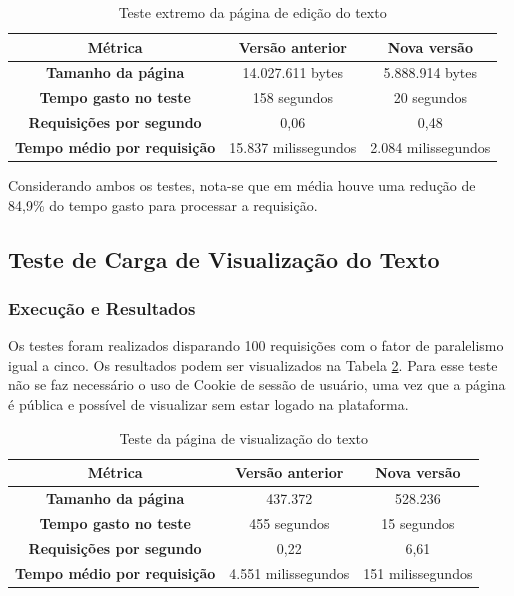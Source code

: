 \begin{table}[h]
	\centering
	\caption{Teste extremo da página de edição do texto}
	\label{tab:teste-carga-extremo-visualizar-rascunho}
	\begin{tabular}{ccc}
		\toprule
		Métrica & Versão anterior & \textbf{Nova versão} \\
		\midrule
    \textbf{Tamanho da página} & 14.027.611 bytes & 5.888.914 bytes \\
    \textbf{Tempo gasto no teste} & 158 segundos & 20 segundos \\
    \textbf{Requisições por segundo} & 0,06 & 0,48 \\
    \textbf{Tempo médio por requisição} & 15.837 milissegundos & 2.084 milissegundos \\
		\bottomrule
	\end{tabular}
\end{table}

Considerando ambos os testes, nota-se que em média houve uma redução de 84,9\% do tempo gasto para processar a requisição.

\subsection {Teste de Carga de Visualização do Texto}

\subsubsection {Execução e Resultados}

Os testes foram realizados disparando 100 requisições com o fator de paralelismo igual a cinco. Os resultados podem ser visualizados na Tabela \ref{tab:teste-carga-visualizar-texto}.
Para esse teste não se faz necessário o uso de Cookie de sessão de usuário, uma vez que a página é pública e possível de visualizar sem estar logado na plataforma.

\begin{table}[h]
	\centering
	\caption{Teste da página de visualização do texto}
	\label{tab:teste-carga-visualizar-texto}
	\begin{tabular}{ccc}
		\toprule
		Métrica & Versão anterior & \textbf{Nova versão} \\
		\midrule
    \textbf{Tamanho da página} & 437.372 & 528.236 \\
    \textbf{Tempo gasto no teste} & 455 segundos & 15 segundos \\
    \textbf{Requisições por segundo} & 0,22 & 6,61 \\
    \textbf{Tempo médio por requisição} & 4.551 milissegundos & 151 milissegundos \\
		\bottomrule
	\end{tabular}
\end{table}

